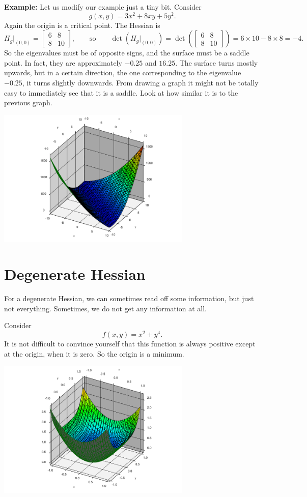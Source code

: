 \documentclass[12pt]{article}
\begin{document}
\pagebreak[2]
\textbf{Example:} Let us modify our example just a tiny bit.
Consider
\[
g(x,y) = 3 x^2 + 8xy  + 5y^2 .
\]
Again the origin is a critical point.
The Hessian is
\[
H_g\big|_{(0,0)} =
\begin{bmatrix}
6 & 8 \\
8 & 10
\end{bmatrix}
,
\qquad \text{so} \qquad
\det(H_g\big|_{(0,0)}) = 
\det \left(
\begin{bmatrix}
6 & 8 \\
8 & 10
\end{bmatrix}
\right)
=
6 \times 10 - 8 \times 8 = -4.
\]
So the eigenvalues must be of opposite signs, and the surface must be a
saddle point.  In fact, they are approximately $-0.25$ and $16.25$.
The surface turns mostly upwards, but in a certain direction, the one
corresponding to the eigenvalue $-0.25$, it turns
slightly downwards.  From drawing a graph it might not be totally easy to
immediately see that it is a saddle.  Look at how similar it is to the
previous graph.
\begin{center}
\includegraphics[width=3.65in]{mostly-upwards.pdf}
\end{center}

\bigskip

\section*{Degenerate Hessian}

For a degenerate Hessian, we can sometimes read off some information, but
just not everything.  Sometimes, we do not get any information at all.

Consider
\[
f(x,y) = x^2 + y^4 .
\]
It is not difficult to convince yourself that this function is always
positive except at the origin, when it is zero.  So the origin is a minimum.
\begin{center}
\includegraphics[width=3.65in]{degenerate-min.pdf}
\end{center}
\end{document}
